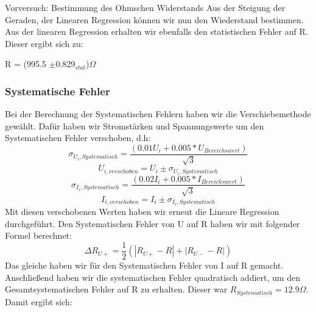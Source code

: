 \documentclass[twoside]{protokoll}
\begin{document}
\begin{aufgabe}{Vorversuch: Bestimmung des Ohmschen Widerstands}
Aus der Steigung der Geraden, der Linearen Regression können wir nun den Wiederstand bestimmen. Aus der linearen Regression erhalten wir ebenfalls den statistischen Fehler auf R.
 Dieser ergibt sich zu:\\

{\centering R = (995.5 $\pm$0.829$_{stat}$)$\Omega$ \par} 


\subsubsection{Systematische Fehler}
Bei der Berechnung der Systematischen Fehlern haben wir die Verschiebemethode gewählt.
Dafür haben wir Stromstärken und Spannungswerte um den Systematischen Fehler verschoben, d.h:
\begin{equation}
    \sigma_{U_i,Systematisch}=\frac{(0.01U_i+ 0.005 * U_{Bereichswert})}{\sqrt{3}}
\end{equation}
\begin{equation}
    U_{i,verschoben} = U_i \pm \sigma_{U_i,Systematisch}
\end{equation}
\begin{equation}
    \sigma_{I_i,Systematisch}=\frac{(0.02I_i+ 0.005 * I_{Bereichswert})}{\sqrt{3}}
\end{equation}
\begin{equation}
    I_{i,verschoben} = I_i \pm \sigma_{I_i,Systematisch}
\end{equation}
Mit diesen verschobenen Werten haben wir erneut die Lineare Regression durchgeführt.
Den Systematischen Fehler von U auf R haben wir mit folgender Formel berechnet:
\begin{equation}
    \Delta R_{U+} = \frac{1}{2} (|R_{U+} - R| + |R_{U-} - R|)
\end{equation}
Das gleiche haben wir für den Systematischen Fehler von I auf R gemacht.
Anschließend haben wir die systematischen Fehler quadratisch addiert, um den Gesamtsystematischen Fehler auf R zu erhalten.
Dieser war $R_{Systematisch} = 12.9\Omega$. \\
 
Damit ergibt sich:

\end{aufgabe}
\end{document}
